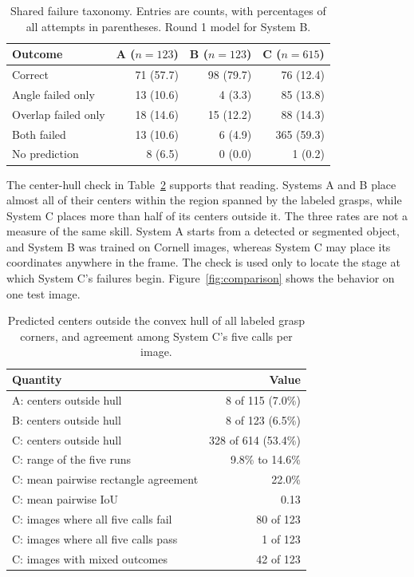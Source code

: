 \documentclass[10pt,conference,compsoc]{IEEEtran}
\begin{document}
\begin{table}[t]
\caption{Shared failure taxonomy. Entries are counts, with percentages of
all attempts in parentheses. Round 1 model for System B.}
\label{tab:taxonomy}
\centering
\footnotesize
\begin{tabular}{lrrr}
\toprule
Outcome & A ($n=123$) & B ($n=123$) & C ($n=615$) \\
\midrule
Correct & 71 (57.7) & 98 (79.7) & 76 (12.4) \\
Angle failed only & 13 (10.6) & 4 (3.3) & 85 (13.8) \\
Overlap failed only & 18 (14.6) & 15 (12.2) & 88 (14.3) \\
Both failed & 13 (10.6) & 6 (4.9) & 365 (59.3) \\
No prediction & 8 (6.5) & 0 (0.0) & 1 (0.2) \\
\bottomrule
\end{tabular}
\end{table}

The center-hull check in Table~\ref{tab:hull} supports that reading. Systems
A and B place almost all of their centers within the region spanned by the
labeled grasps, while System C places more than half of its centers outside
it. The three rates are not a measure of the same skill. System A starts from
a detected or segmented object, and System B was trained on Cornell images,
whereas System C may place its coordinates anywhere in the frame. The check
is used only to locate the stage at which System C's failures begin.
Figure~\ref{fig:comparison} shows the behavior on one test image.

\begin{table}[t]
\caption{Predicted centers outside the convex hull of all labeled grasp
corners, and agreement among System C's five calls per image.}
\label{tab:hull}
\centering
\footnotesize
\begin{tabular}{lr}
\toprule
Quantity & Value \\
\midrule
A: centers outside hull & 8 of 115 (7.0\%) \\
B: centers outside hull & 8 of 123 (6.5\%) \\
C: centers outside hull & 328 of 614 (53.4\%) \\
\midrule
C: range of the five runs & 9.8\% to 14.6\% \\
C: mean pairwise rectangle agreement & 22.0\% \\
C: mean pairwise IoU & 0.13 \\
C: images where all five calls fail & 80 of 123 \\
C: images where all five calls pass & 1 of 123 \\
C: images with mixed outcomes & 42 of 123 \\
\bottomrule
\end{tabular}
\end{table}
\end{document}
